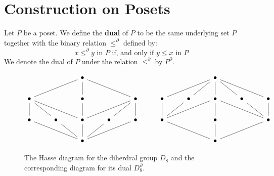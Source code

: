 \section{Construction on Posets}
\label{section_1.4}

\begin{definition}
  Let $P$ be a poset. We define the \textbf{dual} of $P$ to be the
  same underlying set $P$ together with the binary relation
  $\leq^\partial$ defined by:
  \begin{equation*}
    x \leq^\partial y \text{ in } P \text{ if, and only if }
    y \leq x \text{ in } P
  \end{equation*}
  We denote the dual of $P$ under the relation $\leq^\partial$ by
  $P^\partial$.
\end{definition}

\begin{figure}[h]
  \centering
  \[\begin{tikzcd}
  && \bullet &&&&& \bullet \\
    \bullet && \bullet && \bullet & \bullet & \bullet & \bullet & \bullet & \bullet \\
    \bullet & \bullet & \bullet & \bullet & \bullet & \bullet && \bullet && \bullet \\
            && \bullet &&&&& \bullet
            \arrow[no head, from=1-8, to=2-6]
            \arrow[no head, from=1-8, to=2-7]
            \arrow[no head, from=1-8, to=2-8]
            \arrow[no head, from=1-8, to=2-9]
            \arrow[no head, from=1-8, to=2-10]
            \arrow[no head, from=2-1, to=1-3]
            \arrow[no head, from=2-3, to=1-3]
            \arrow[no head, from=2-5, to=1-3]
            \arrow[no head, from=2-7, to=3-6]
            \arrow[no head, from=2-8, to=3-8]
            \arrow[no head, from=2-8, to=3-10]
            \arrow[no head, from=2-9, to=3-10]
            \arrow[no head, from=2-10, to=3-10]
            \arrow[no head, from=3-1, to=2-1]
            \arrow[no head, from=3-2, to=2-1]
            \arrow[no head, from=3-3, to=2-1]
            \arrow[no head, from=3-3, to=2-3]
            \arrow[no head, from=3-3, to=2-5]
            \arrow[no head, from=3-4, to=2-5]
            \arrow[no head, from=3-5, to=2-5]
            \arrow[no head, from=3-6, to=2-6]
            \arrow[no head, from=3-6, to=2-8]
            \arrow[no head, from=3-8, to=4-8]
            \arrow[no head, from=3-10, to=4-8]
            \arrow[no head, from=4-3, to=3-1]
            \arrow[no head, from=4-3, to=3-2]
            \arrow[no head, from=4-3, to=3-3]
            \arrow[no head, from=4-3, to=3-4]
            \arrow[no head, from=4-3, to=3-5]
            \arrow[no head, from=4-8, to=3-6]
  \end{tikzcd}\]
  \caption{The Hasse diagram for the diherdral group $D_8$ and the
  corresponding diagram for its dual $D_8^\partial$.}
  \label{}
\end{figure}

